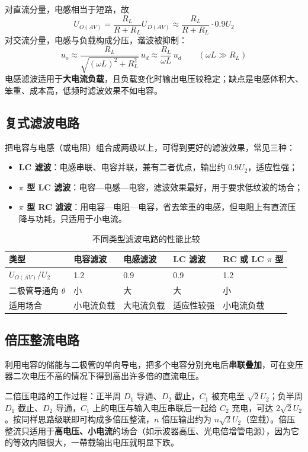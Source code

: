 对直流分量，电感相当于短路，故
\begin{equation}
U_{O(AV)}=\frac{R_L}{R+R_L}U_{D(AV)}\approx\frac{R_L}{R+R_L}\cdot0.9U_2
\end{equation}
对交流分量，电感与负载构成分压，谐波被抑制：
\begin{equation}
u_o\approx\frac{R_L}{\sqrt{(\omega L)^2+R_L^2}}\,u_d
\approx\frac{R_L}{\omega L}\,u_d \qquad(\omega L\gg R_L)
\end{equation}
电感滤波适用于\textbf{大电流负载}，且负载变化时输出电压较稳定；缺点是电感体积大、笨重、成本高，低频时滤波效果不如电容。

\subsection{复式滤波电路}
把电容与电感（或电阻）组合成两级以上，可得到更好的滤波效果，常见三种：
\begin{itemize}
    \item \textbf{LC 滤波}：电感串联、电容并联，兼有二者优点，输出约 $0.9U_2$，适应性强；
    \item \textbf{$\pi$ 型 LC 滤波}：电容—电感—电容，滤波效果最好，用于要求低纹波的场合；
    \item \textbf{$\pi$ 型 RC 滤波}：用电容—电阻—电容，省去笨重的电感，但电阻上有直流压降与功耗，只适用于小电流。
\end{itemize}

\begin{table}[htbp]
\centering
\caption{不同类型滤波电路的性能比较}
\begin{tabular}{@{}lllll@{}}
\hline
类型 & 电容滤波 & 电感滤波 & LC 滤波 & RC 或 LC $\pi$ 型 \\
\hline
$U_{O(AV)}/U_2$ & 1.2 & 0.9 & 0.9 & 1.2 \\
二极管导通角 $\theta$ & 小 & 大 & 大 & 小 \\
适用场合 & 小电流负载 & 大电流负载 & 适应性较强 & 小电流负载 \\
\hline
\end{tabular}
\end{table}

\subsection{倍压整流电路}
利用电容的储能与二极管的单向导电，把多个电容分别充电后\textbf{串联叠加}，可在变压器二次电压不高的情况下得到高出许多倍的直流电压。

二倍压电路的工作过程：正半周 $D_1$ 导通、$D_2$ 截止，$C_1$ 被充电至 $\sqrt2U_2$；负半周 $D_1$ 截止、$D_2$ 导通，$C_1$ 上的电压与输入电压串联后一起给 $C_2$ 充电，可达 $2\sqrt2U_2$。按同样思路级联即可构成多倍压整流，$n$ 倍压输出约为 $n\sqrt2U_2$（空载）。倍压整流只适用于\textbf{高电压、小电流}的场合（如示波器高压、光电倍增管电源），因为它的等效内阻很大，一帶载输出电压就明显下跌。

